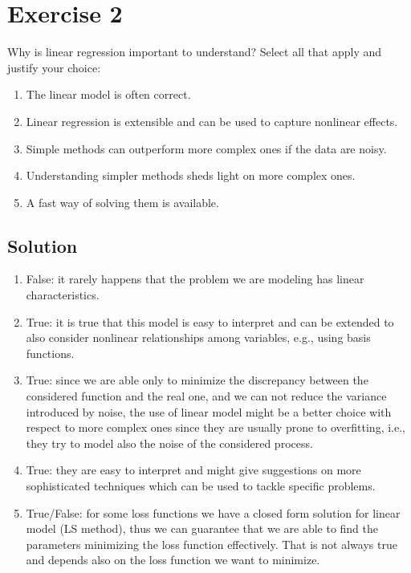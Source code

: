 \section{Exercise 2}

Why is linear regression important to understand? 
Select all that apply and justify your choice:
\begin{enumerate}
    \item The linear model is often correct.
    \item Linear regression is extensible and can be used to capture nonlinear effects.
    \item Simple methods can outperform more complex ones if the data are noisy.
    \item Understanding simpler methods sheds light on more complex ones.
    \item A fast way of solving them is available.
\end{enumerate}

\subsection*{Solution}
\begin{enumerate}
    \item False: it rarely happens that the problem we are modeling has linear characteristics.
    \item True: it is true that this model is easy to interpret and can be extended to also consider nonlinear relationships among variables, e.g., using basis functions.
    \item True: since we are able only to minimize the discrepancy between the considered function and the real one, and we can not reduce the variance introduced by noise, the use of linear model might be a better choice with respect to more complex ones since they are usually prone to overfitting, i.e., they try to model also the noise of the considered process.
    \item True: they are easy to interpret and might give suggestions on more sophisticated techniques which can be used to tackle specific problems.
    \item True/False: for some loss functions we have a closed form solution for linear model (LS method), thus we can guarantee that we are able to find the parameters minimizing the loss function effectively. 
        That is not always true and depends also on the loss function we want to minimize.
\end{enumerate}